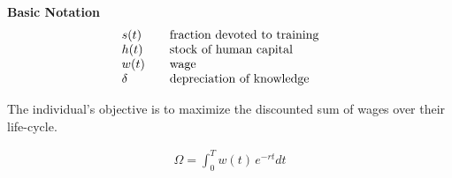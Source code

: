 \begin{frame}\textbf{Basic Notation}\vspace{0.3cm}
\begin{align*}\begin{array}{l@{\qquad}l@{\qquad}l}
s(t) 	& \text{fraction devoted to training} \\
h(t)    & \text{stock of human capital} \\
w(t)	& \text{wage} \\
\delta  & \text{depreciation of knowledge}
\end{array}\end{align*}
\end{frame}
\begin{frame}
The individual's objective is to maximize the discounted sum of wages over their life-cycle.

\begin{align*}
\Omega = \int^T_0 w(t)\, e^{-r t} dt
\end{align*}
\end{frame}

